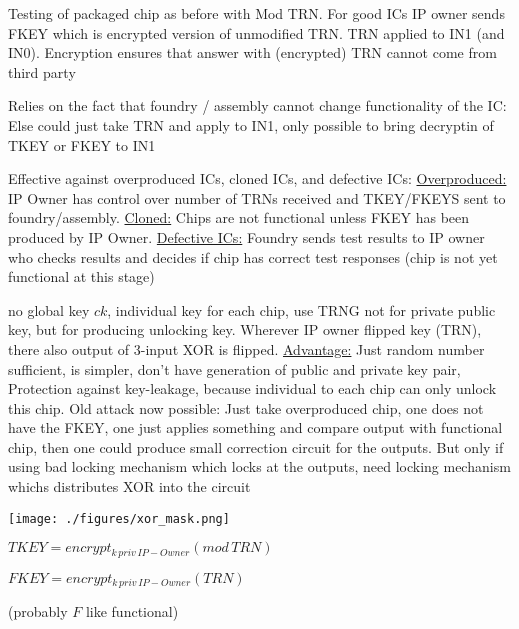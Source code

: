 \documentclass[landscape, a4paper]{article}
\begin{document}
\begin{minipage}[t]{0.2\linewidth}
\begin{betterlist}
\begin{betterlist}
\begin{betterlist}
				\item Testing of packaged chip as before with Mod TRN. For good ICs IP owner sends FKEY which is encrypted version of unmodified TRN. TRN applied to IN1 (and IN0). Encryption ensures that answer with (encrypted) TRN cannot come from third party
				\item \alert{Relies on the fact that foundry / assembly cannot change functionality of the IC:} Else could just take TRN and apply to IN1, only possible to bring decryptin of TKEY or FKEY to IN1
        \item \alert{Effective against overproduced ICs, cloned ICs, and defective ICs:} \underline{Overproduced:} IP Owner has control over number of TRNs received and TKEY/FKEYS sent to foundry/assembly. \underline{Cloned:} Chips are not functional unless FKEY has been produced by IP Owner. \underline{Defective ICs:} Foundry sends test results to IP owner who checks results and decides if chip has correct test responses (chip is not yet functional at this stage)
				\item no global key $ck$, individual key for each chip, use TRNG not for private public key, but for producing unlocking key. Wherever IP owner flipped key (TRN), there also output of 3-input XOR is flipped. \underline{Advantage:} Just random number sufficient, is simpler, don't have generation of public and private key pair, Protection against key-leakage, because individual to each chip can only unlock this chip. Old attack now possible: Just take overproduced chip, one does not have the FKEY, one just applies something and compare output with functional chip, then one could produce small correction circuit for the outputs. But only if using bad locking mechanism which locks at the outputs, need locking mechanism whichs distributes XOR into the circuit %

				\begin{minipage}[b]{0.5\linewidth}
					\texttt{[image: ./figures/xor\_mask.png]}
				\end{minipage}
				\begin{minipage}[b]{0.4\linewidth}
					$TKEY = encrypt_{k\,priv\,IP-Owner}(mod\,TRN)$

					$FKEY = encrypt_{k\,priv\,IP-Owner}(TRN)$

          (probably $F$ like functional)
				\end{minipage}


\end{betterlist}
\end{betterlist}
\end{betterlist}
\end{minipage}
\end{document}
